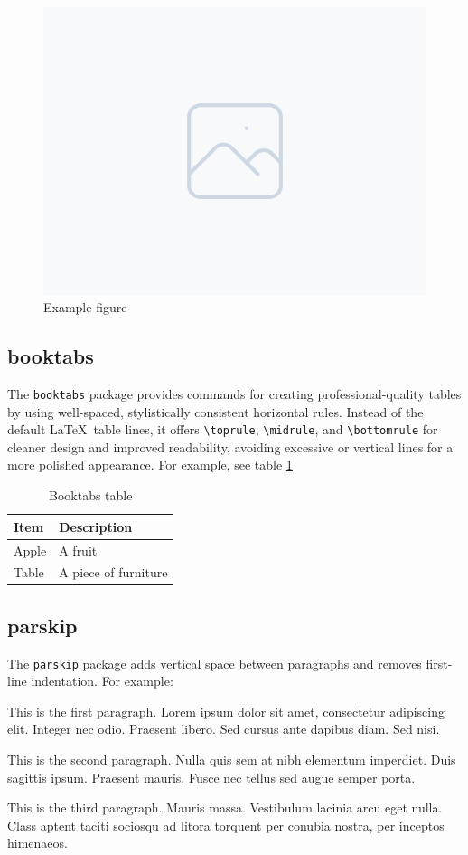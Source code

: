 \documentclass{lecturenotes}
\begin{document}
\begin{figure}[H]
\centering
\includegraphics[width=0.3\linewidth]{images/example.png}
\caption{Example figure}
\label{fig:graphicx}
\end{figure}


\subsection{booktabs}
The \texttt{booktabs} \cite{ctan:booktabs} package provides commands for creating professional-quality tables by using well-spaced, stylistically consistent horizontal rules. Instead of the default \LaTeX\ table lines, it offers \verb|\toprule|, \verb|\midrule|, and \verb|\bottomrule| for cleaner design and improved readability, avoiding excessive or vertical lines for a more polished appearance. For example, see table \ref{table:booktabs}

\begin{table}[H]
\centering
\begin{tabular}{@{}ll@{}}
\toprule
Item & Description \\
\midrule
Apple & A fruit \\
Table & A piece of furniture \\
\bottomrule
\end{tabular}
\caption{Booktabs table}
\label{table:booktabs}
\end{table}

\subsection{parskip}
The \texttt{parskip} \cite{ctan:parskip} package adds vertical space between paragraphs and removes first-line indentation. For example:

This is the first paragraph. Lorem ipsum dolor sit amet, consectetur adipiscing elit. Integer nec odio. Praesent libero. Sed cursus ante dapibus diam. Sed nisi.

This is the second paragraph. Nulla quis sem at nibh elementum imperdiet. Duis sagittis ipsum. Praesent mauris. Fusce nec tellus sed augue semper porta.

This is the third paragraph. Mauris massa. Vestibulum lacinia arcu eget nulla. Class aptent taciti sociosqu ad litora torquent per conubia nostra, per inceptos himenaeos.
\end{document}
